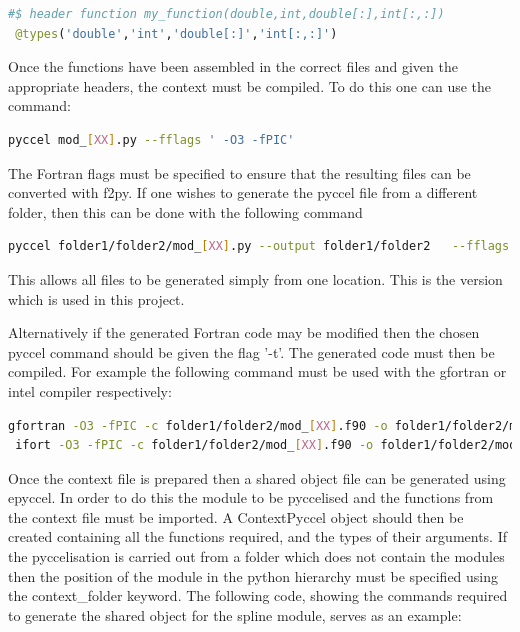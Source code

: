 \begin{lstlisting}[language=python,style=pythonStyle]
 #$ header function my_function(double,int,double[:],int[:,:])
 @types('double','int','double[:]','int[:,:]')
\end{lstlisting}

Once the functions have been assembled in the correct files and given the appropriate headers, the context must be compiled. To do this one can use the command:

\begin{lstlisting}[language=bash,style=bashStyle]
 pyccel mod_[XX].py --fflags ' -O3 -fPIC'
\end{lstlisting}

The Fortran flags must be specified to ensure that the resulting files can be converted with f2py. If one wishes to generate the pyccel file from a different folder, then this can be done with the following command

\begin{lstlisting}[language=bash,style=bashStyle]
 pyccel folder1/folder2/mod_[XX].py --output folder1/folder2   --fflags ' -O3 -fPIC'
\end{lstlisting}

This allows all files to be generated simply from one location. This is the version which is used in this project.

Alternatively if the generated Fortran code may be modified then the chosen pyccel command should be given the flag '-t'. The generated code must then be compiled. For example the following command must be used with the gfortran or intel compiler respectively:

\begin{lstlisting}[language=bash,style=bashStyle]
 gfortran -O3 -fPIC -c folder1/folder2/mod_[XX].f90 -o folder1/folder2/mod_[XX].o  -J folder1/folder2/
 ifort -O3 -fPIC -c folder1/folder2/mod_[XX].f90 -o folder1/folder2/mod_[XX].o  -module folder1/folder2/
\end{lstlisting}

Once the context file is prepared then a shared object file can be generated using epyccel. In order to do this the module to be pyccelised and the functions from the context file must be imported. A ContextPyccel object should then be created containing all the functions required, and the types of their arguments. If the pyccelisation is carried out from a folder which does not contain the modules then the position of the module in the python hierarchy must be specified using the context\_folder keyword. The following code, showing the commands required to generate the shared object for the spline module, serves as an example:


